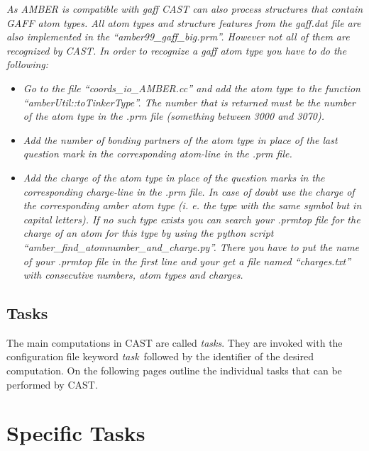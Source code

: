 \documentclass[10pt,a4paper]{article} %
\begin{document}
\textit{As \ac{AMBER} is compatible with gaff \ac{CAST} can also process structures that contain GAFF atom types. All atom types and structure features from the gaff.dat file are also implemented in the ``amber99\_gaff\_big.prm''. However not all of them are recognized by CAST. In order to recognize a gaff atom type you have to do the following:}
\begin{itemize}
\item \textit{Go to the file ``coords\_io\_AMBER.cc'' and add the atom type to the function ``amberUtil::toTinkerType''. The number that is returned must be the number of the atom type in the .prm file (something between 3000 and 3070).}
\item \textit{Add the number of bonding partners of the atom type in place of the last question mark in the corresponding atom-line in the .prm file.} 
\item \textit{Add the charge of the atom type in place of the question marks in the corresponding charge-line in the .prm file. In case of doubt use the charge of the corresponding amber atom type (i. e. the type with the same symbol but in capital letters). If no such type exists you can search your .prmtop file for the charge of an atom for this type by using the python script ``amber\_find\_atomnumber\_and\_charge.py''. There you have to put the name of your .prmtop file in the first line and
your get a file named ``charges.txt'' with consecutive numbers, atom types and charges.}
\end{itemize}

	\subsection{Tasks}
	The main computations in \ac{CAST} are called \textit{tasks}. They are invoked with the configuration file keyword \glqq\textit{task}\grqq~followed by the identifier of the desired computation. On the following pages outline the individual tasks that can be performed by \ac{CAST}.

	\newpage

	\section{Specific Tasks}

\end{document}
